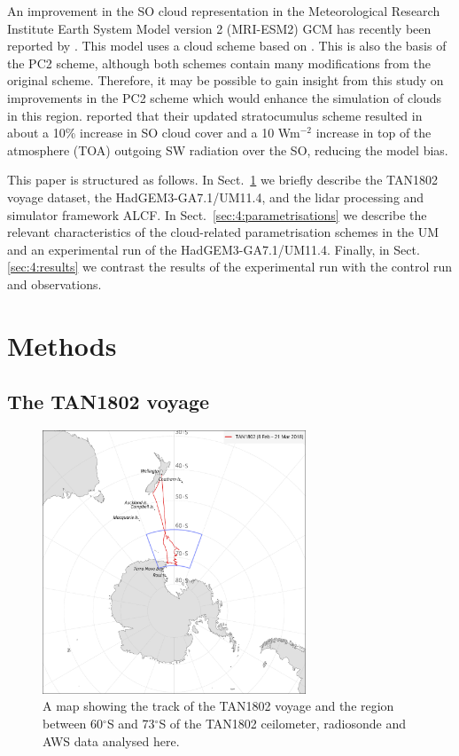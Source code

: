 An improvement in the SO cloud representation in the Meteorological Research Institute Earth System Model version 2 (MRI-ESM2) GCM has recently been
reported by \cite{kawai2019}. This model uses a cloud scheme based on
\cite{tiedtke1993}. This is also the basis of the PC2 scheme, although both
schemes contain many modifications from the original scheme. Therefore, it may be
possible to gain insight from this study on improvements in the PC2 scheme which would enhance the simulation of clouds in this region. \cite{kawai2019} reported that their updated stratocumulus scheme resulted in about
a 10\% increase in SO cloud cover and a 10 Wm$^{-2}$ increase in top of the atmosphere
(TOA) outgoing SW radiation over the SO, reducing the model bias.

This paper is structured as follows.
In Sect.~\ref{sec:4:methods} we briefly describe the TAN1802 voyage dataset,
the HadGEM3-GA7.1/UM11.4, and the lidar processing and simulator framework ALCF.
In Sect.~\ref{sec:4:parametrisations} we describe the
relevant characteristics of the cloud-related parametrisation schemes in the UM
and an experimental run of the HadGEM3-GA7.1/UM11.4. Finally, in Sect.
\ref{sec:4:results} we contrast the results
of the experimental run with the control run and observations.

\section{Methods}
\label{sec:4:methods}

\subsection{The TAN1802 voyage}

\begin{figure}[t]
\centering
\includegraphics[width=0.7\textwidth]{chapter4/fig/map.pdf}
\caption[A map showing the track of the TAN1802 voyage]{A map showing the track of the TAN1802 voyage and the region
between 60$^\circ$S and 73$^\circ$S of the TAN1802 ceilometer, radiosonde
and AWS data analysed here.
}
\label{fig:4:map}
\end{figure}


